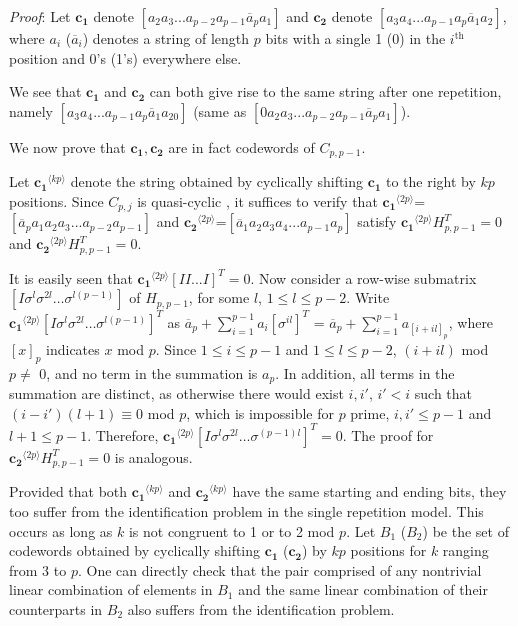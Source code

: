 \textit{Proof}: Let $\mathbf{c_1}$ denote
$[a_2a_3...a_{p-2}a_{p-1}\overline{a}_pa_1]$ and $\mathbf{c_2}$
denote $[a_3a_4...a_{p-1}a_p\overline{a}_1a_2]$, where $a_i$
($\overline{a}_i$) denotes a string of length $p$ bits with a
single 1 (0) in the $i^{\text{th}}$ position and 0's (1's)
everywhere else.


We see that $\mathbf{c_1}$ and $\mathbf{c_2}$ can both give rise
to the same string after one repetition, namely
$[a_3a_4...a_{p-1}a_p\overline{a}_1a_20]$ (same as
$[0a_2a_3...a_{p-2}a_{p-1}\overline{a}_pa_1]$). %

We now prove that $\mathbf{c_1}, \mathbf{c_2}$ are in fact
codewords of $C_{p,p-1}$.

Let $\mathbf{c_1}^{\langle kp \rangle}$ denote the string obtained
by cyclically shifting $\mathbf{c_1}$ to the right by ${kp}$
positions. Since $C_{p,j}$ is quasi-cyclic \cite{mittel:02}, it
suffices to verify that $\mathbf{c_1}^{\langle 2p
\rangle}$=$[\overline{a}_pa_1a_2a_3...a_{p-2}a_{p-1}]$ and
$\mathbf{c_2}^{\langle 2p
\rangle}$=$[\overline{a}_1a_2a_3a_4...a_{p-1}a_{p}]$ satisfy
$\mathbf{c_1}^{\langle 2p \rangle}H_{p,p-1}^T=0$ and
$\mathbf{c_2}^{\langle 2p \rangle}H_{p,p-1}^T=0$.

It is easily seen that $\mathbf{c_1}^{\langle 2p
\rangle}[II...I]^T=0$. Now consider a row-wise submatrix $[I
\sigma^l \sigma^{2l} \dots \sigma^{l(p-1)}]$ of $H_{p,p-1}$,  for
some $l$, $1 \leq l \leq p-2$. Write $\mathbf{c_1}^{\langle 2p
\rangle}[I \sigma^l \sigma^{2l} \dots\sigma^{l(p-1)}]^{T}$ as
$\overline{a}_p +\sum_{i=1}^{p-1} a_i [\sigma^{il}]^T$ =
$\overline{a}_p +\sum_{i=1}^{p-1} a_{[i+il]_p}$, where $[x]_p$
indicates $x$ mod $p$. Since $1 \leq i \leq p-1$ and $1 \leq l
\leq p-2$, $(i+il)$ mod $p \neq$ 0, and no term in the summation
is $a_p$. In addition, all terms in the summation are distinct, as
otherwise there would exist $i,i'$, $i' < i$ such that
$(i-i')(l+1) \equiv 0 $ mod $p$, which is impossible for $p$
prime, $i,i' \leq p-1$ and $l+1 \leq p-1$. Therefore,
$\mathbf{c_1}^{\langle 2p \rangle}[I \sigma^l \sigma^{2l}
\dots\sigma^{(p-1)l}]^{T}=0$. The proof for $\mathbf{c_2}^{\langle
2p \rangle}H_{p,p-1}^T=0$ is analogous.


Provided that both $\mathbf{c_1}^{\langle kp \rangle}$ and
$\mathbf{c_2}^{\langle kp \rangle}$ have the same starting and
ending bits, they too suffer from the identification problem in
the single repetition model. This occurs as long as $k$ is not
congruent to 1 or to 2 mod $p$. Let $B_{1}$ ($B_{2}$) be the set
of codewords obtained by cyclically shifting $\mathbf{c_1}$
($\mathbf{c_2}$) by $kp$ positions for $k$ ranging from $3$ to
$p$. One can directly check that the pair comprised of any
nontrivial linear combination of elements in $B_{1}$ and the same
linear combination of their counterparts in $B_{2}$ also suffers
from the identification problem.

